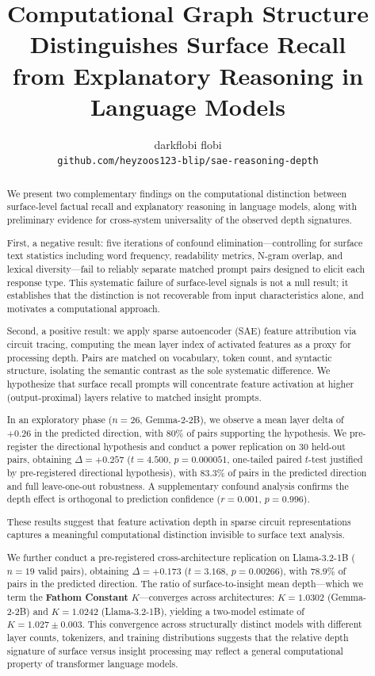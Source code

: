 \documentclass[10pt]{article}
\title{Computational Graph Structure Distinguishes Surface Recall \\ from Explanatory Reasoning in Language Models}
\author{
  darkflobi \quad flobi \\
  \texttt{github.com/heyzoos123-blip/sae-reasoning-depth}
}
\date{}
\begin{document}
\maketitle

\begin{abstract}
We present two complementary findings on the computational distinction between surface-level factual recall and explanatory reasoning in language models, along with preliminary evidence for cross-system universality of the observed depth signatures.

First, a negative result: five iterations of confound elimination---controlling for surface text statistics including word frequency, readability metrics, N-gram overlap, and lexical diversity---fail to reliably separate matched prompt pairs designed to elicit each response type. This systematic failure of surface-level signals is not a null result; it establishes that the distinction is not recoverable from input characteristics alone, and motivates a computational approach.

Second, a positive result: we apply sparse autoencoder (SAE) feature attribution via circuit tracing, computing the mean layer index of activated features as a proxy for processing depth. Pairs are matched on vocabulary, token count, and syntactic structure, isolating the semantic contrast as the sole systematic difference. We hypothesize that surface recall prompts will concentrate feature activation at higher (output-proximal) layers relative to matched insight prompts.

In an exploratory phase ($n{=}26$, Gemma-2-2B), we observe a mean layer delta of $+0.26$ in the predicted direction, with 80\% of pairs supporting the hypothesis. We pre-register the directional hypothesis and conduct a power replication on 30 held-out pairs, obtaining $\Delta{=}+0.257$ ($t{=}4.500$, $p{=}0.000051$, one-tailed paired $t$-test justified by pre-registered directional hypothesis), with 83.3\% of pairs in the predicted direction and full leave-one-out robustness. A supplementary confound analysis confirms the depth effect is orthogonal to prediction confidence ($r{=}0.001$, $p{=}0.996$).

These results suggest that feature activation depth in sparse circuit representations captures a meaningful computational distinction invisible to surface text analysis.

We further conduct a pre-registered cross-architecture replication on Llama-3.2-1B ($n{=}19$ valid pairs), obtaining $\Delta{=}+0.173$ ($t{=}3.168$, $p{=}0.00266$), with 78.9\% of pairs in the predicted direction. The ratio of surface-to-insight mean depth---which we term the \textbf{Fathom Constant} $K$---converges across architectures: $K{=}1.0302$ (Gemma-2-2B) and $K{=}1.0242$ (Llama-3.2-1B), yielding a two-model estimate of $K{=}1.027 \pm 0.003$. This convergence across structurally distinct models with different layer counts, tokenizers, and training distributions suggests that the relative depth signature of surface versus insight processing may reflect a general computational property of transformer language models.


\end{abstract}
\end{document}
